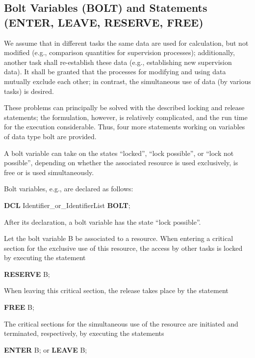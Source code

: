 \subsection{Bolt Variables (BOLT) and Statements (ENTER, LEAVE,
RESERVE, FREE)} %
\label{sec_bolt}

We assume that in different tasks the same data are used for
calculation, but not modified (e.g., comparison quantities for
supervision processes); additionally, another task shall re-establish
these data (e.g., establishing new supervision data). It shall be
granted that the processes for modifying and using data mutually exclude
each other; in contrast, the simultaneous use of data (by various tasks)
is desired.

These problems can principally be solved with the described locking and
release statements; the formulation, however, is relatively
complicated, and the run time for the execution considerable. Thus, four
more statements working on variables of data type bolt are provided.

A bolt variable can take on the states ``locked'', ``lock possible'', or
``lock not possible'', depending on whether the associated resource
is used exclusively, is free or is used simultaneously.

Bolt variables, e.g., are declared as follows:

{\bf DCL} Identifier\_or\_IdentifierList {\bf BOLT};

After its declaration, a bolt variable has the state ``lock possible''.

Let the bolt variable B be associated to a resource. When entering a
critical section for the exclusive use of this resource, the access by
other tasks is locked by executing the statement

{\bf RESERVE} B;

When leaving this critical section, the release takes place by the
statement

{\bf FREE} B;

The critical sections for the simultaneous use of the resource are
initiated and terminated, respectively, by executing the statements

{\bf ENTER} B; or {\bf LEAVE} B;

